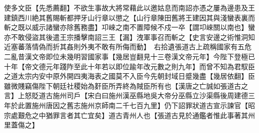 使多文臣【先悉薦翻】不欲生事故大將常藉此以邀姑息而南詔亦憑之屢為邊患及王建鎮西川絶其舊賜斬都押牙山行章以懲之【山行章陳田舊將王建因其與淺蠻表裏而斬之既以威示諸蠻亦除舊務盡】卭崍之南不置障候不戍一卒【謂卭崍關以南也】蠻亦不敢侵盜其後遣王宗播擊南詔三王【漏】洩軍事召而斬之【史言安邊之術惟洞知近塞蕃落情偽而折其姦則外夷不敢有所侮而動】　右拾遺張道古上疏稱國家有五危二亂昔漢文帝即位未幾明習國家事【幾居豈翻見十三卷漢文帝元年】今陛下登極已十年【帝文德元年踐阼至此十年若以即位踰年改元數之則九年】而曾不知為君馭臣之道太宗内安中原外開四夷海表之國莫不入臣今先朝封域日蹙幾盡【幾居依翻】臣雖微賤竊傷陛下朝廷社稷始為姧臣所弄終為賊臣所有也【漢唐之亡誠如張道古之言】上怒貶道古施州司戶【宋白曰施州漢巫縣地吳大帝分巫縣立沙渠縣後周建德三年於此置施州唐因之舊志施州京師南二千七百九里】仍下詔罪狀道古宣示諫官【昭宗處艱危之中猶罪言者其亡宜矣】道古青州人也【張道古見於通鑑者惟此事著其州里蓋傷之】


